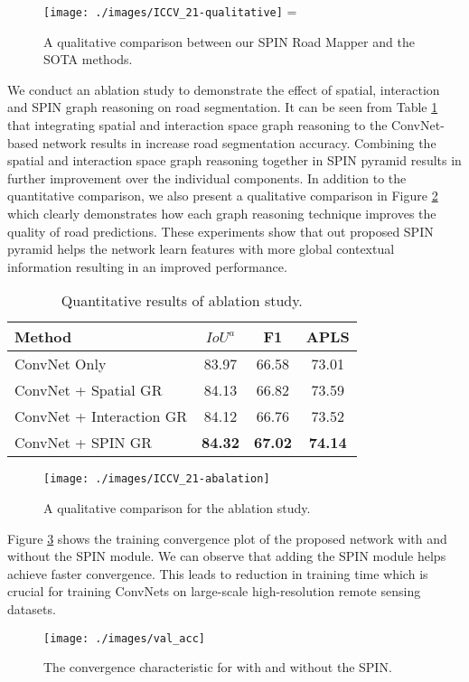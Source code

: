 \documentclass[letterpaper, 10 pt, conference]{ieeeconf}
\begin{document}
\begin{figure}[tb]
	\centering
	\texttt{[image: ./images/ICCV\_21-qualitative]}
    \vskip-20pt	=
    \caption{A qualitative comparison between our SPIN Road Mapper and the SOTA methods. 
}
	\label{qualitative_results}
	\vspace{-5mm}
\end{figure}
 We conduct an ablation study to demonstrate the effect of spatial, interaction and SPIN graph reasoning on road segmentation. It can be seen from Table \ref{Abalation_study_GR} that integrating spatial and interaction space graph reasoning to the ConvNet-based network results in increase road segmentation accuracy. Combining the spatial and interaction space graph reasoning together in SPIN pyramid results in further improvement over the individual components. In addition to the quantitative comparison, we also present a qualitative comparison in Figure \ref{abalation_qualitative} which clearly demonstrates how each graph reasoning technique improves the quality of road predictions. These experiments show that out proposed SPIN pyramid helps the network learn features with more global contextual information resulting in an improved performance.

\begin{table}[tb]
	\centering
	\caption{Quantitative results of ablation study.}
	\vskip-10pt
	\begin{tabular}{lccc} \toprule
		Method & {$IoU^a$} & {F1} & APLS  \\
		\midrule
		ConvNet Only 	            & 83.97 & 66.58 & 73.01\\
		ConvNet + Spatial GR        & 84.13	& 66.82 & 73.59\\
		ConvNet + Interaction GR    & 84.12 & 66.76 & 73.52\\
		ConvNet + SPIN GR           & \textbf{84.32} & \textbf{67.02} & \textbf{74.14}\\
		\bottomrule
	\end{tabular}
	\label{Abalation_study_GR}
\end{table}
\begin{figure}[tb]
	\centering
	\texttt{[image: ./images/ICCV\_21-abalation]}
    \vskip-10pt
    \caption{A qualitative comparison for the ablation study.
}
	\label{abalation_qualitative}
\end{figure}
 Figure \ref{convergence} shows the training convergence plot of the proposed network with and without the SPIN module. We can observe that adding the SPIN module helps achieve faster convergence. This leads to reduction in training time which is crucial for training ConvNets on large-scale high-resolution remote sensing datasets.
\begin{figure}[tb!]
	\vspace{-9pt}
	\centering
	\texttt{[image: ./images/val\_acc]}
    \vskip-10pt	
    \caption{The convergence characteristic for with and without the SPIN.}
	\label{convergence}
	\vspace{-5mm}
\end{figure}
\end{document}

